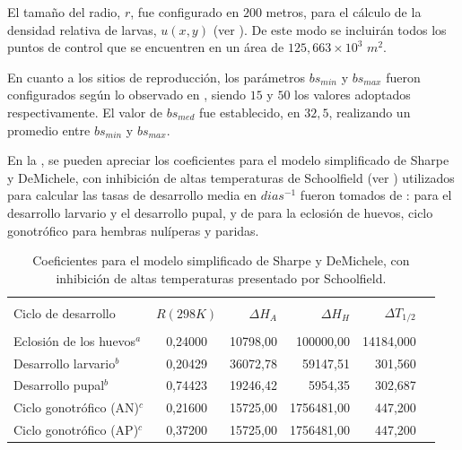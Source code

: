 El tamaño del radio, $r$, fue configurado en $200$ metros, para el cálculo de la densidad relativa
de larvas, $u(x,y)$ (ver ). De este modo se incluirán todos los
puntos de control que se encuentren en un área de $125,663 \times 10^{3}$ $m^{2}$.

En cuanto a los sitios de reproducción, los parámetros $bs_{min}$ y $bs_{max}$ fueron
configurados según lo observado en \cite{otero2006stochastic, otero2008stochastic}, siendo $15$ y
$50$ los valores adoptados respectivamente.  El valor de $bs_{med}$ fue establecido, en $32,5$,
realizando un promedio entre $bs_{min}$ y $bs_{max}$.

En la , se pueden apreciar los coeficientes para el modelo
simplificado de Sharpe y DeMichele, con inhibición de altas temperaturas de Schoolfield (ver
) utilizados para calcular las tasas de desarrollo media
en $dias^{-1}$ fueron tomados de : \cite{rueda1990temperature} para el desarrollo larvario y el
desarrollo pupal, y de \cite{otero2006stochastic} para la eclosión de huevos, ciclo gonotrófico para hembras nulíperas y paridas.

\begin{table}[!htpb]
\begin{minipage}{\textwidth}
    \centering
    \caption{ \label{tab:coef-sharpe-demichele} Coeficientes para el modelo simplificado de Sharpe y DeMichele, con inhibición de altas temperaturas presentado por Schoolfield.}
    \begin{tabular}{p{6cm} c r r r r }
        \hline \\
        Ciclo de desarrollo    & $R(298K)$ & $\Delta H_{A}$ & $\Delta H_{H}$ & $\Delta T_{1/2}$  \\
        \hline
        \hline\\
        Eclosión de los huevos$^a$ & 0,24000 & 10798,00 &  100000,00  & 14184,000\\
        Desarrollo larvario$^b$    & 0,20429 & 36072,78 &   59147,51  &   301,560\\
        Desarrollo pupal$^b$       & 0,74423 & 19246,42 &    5954,35  &   302,687\\
        Ciclo gonotrófico (AN)$^c$ & 0,21600 & 15725,00 & 1756481,00  &   447,200\\
        Ciclo gonotrófico (AP)$^c$ & 0,37200 & 15725,00 & 1756481,00  &   447,200\\
    \end{tabular}
\end{minipage}
\end{table}

